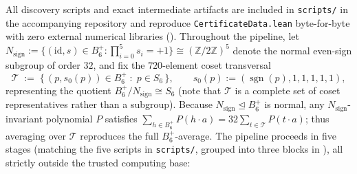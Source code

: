 \documentclass[11pt,a4paper]{article}
\theoremstyle{plain}
\theoremstyle{definition}
\theoremstyle{remark}
\newcommand{\Z}{\mathbb{Z}}
\newcommand{\sgn}{\operatorname{sgn}}
\newcommand{\Bplus}{B_6^+}
\newcommand{\code}[1]{\texttt{\small #1}}
\begin{document}
All discovery scripts and exact intermediate artifacts are included in \code{scripts/} in the accompanying repository and reproduce \code{CertificateData.lean} byte-for-byte with zero external numerical libraries (). Throughout the pipeline, let $N_{\mathrm{sign}} := \{(\mathrm{id}, s) \in \Bplus : \prod_{i=0}^5 s_i = +1\} \cong (\Z/2\Z)^5$ denote the normal even-sign subgroup of order $32$, and fix the $720$-element coset transversal
\begin{equation}
  \label{eq:transversal}
  \mathcal{T} \;:=\; \bigl\{\, (p, s_0(p)) \in \Bplus \;:\; p \in S_6 \,\bigr\},
  \qquad s_0(p) := (\sgn(p), 1, 1, 1, 1, 1),
\end{equation}
representing the quotient $\Bplus / N_{\mathrm{sign}} \cong S_6$ (note that $\mathcal{T}$ is a complete set of coset representatives rather than a subgroup). Because $N_{\mathrm{sign}} \trianglelefteq \Bplus$ is normal, any $N_{\mathrm{sign}}$-invariant polynomial $P$ satisfies $\sum_{h\in\Bplus} P(h\cdot a) = 32 \sum_{t\in\mathcal{T}} P(t\cdot a)$; thus averaging over $\mathcal{T}$ reproduces the full $\Bplus$-average. The pipeline proceeds in five stages (matching the five scripts in \code{scripts/}, grouped into three blocks in ), all strictly outside the trusted computing base:
\end{document}
